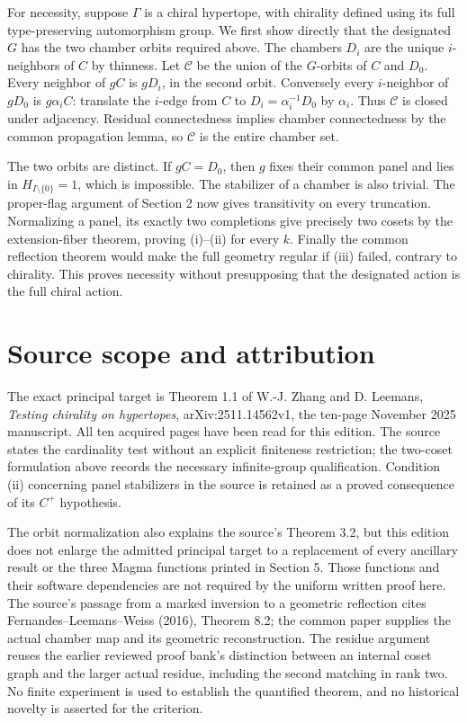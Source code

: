 For necessity, suppose $\Gamma$ is a chiral hypertope, with chirality defined using its full type-preserving automorphism group. We first show directly that the designated $G$ has the two chamber orbits required above. The chambers $D_i$ are the unique $i$-neighbors of $C$ by thinness. Let $\mathcal C$ be the union of the $G$-orbits of $C$ and $D_0$. Every neighbor of $gC$ is $gD_i$, in the second orbit. Conversely every $i$-neighbor of $gD_0$ is $g\alpha_i C$: translate the $i$-edge from $C$ to $D_i=\alpha_i^{-1}D_0$ by $\alpha_i$. Thus $\mathcal C$ is closed under adjacency. Residual connectedness implies chamber connectedness by the common propagation lemma, so $\mathcal C$ is the entire chamber set.

The two orbits are distinct. If $gC=D_0$, then $g$ fixes their common panel and lies in $H_{I\setminus\{0\}}=1$, which is impossible. The stabilizer of a chamber is also trivial. The proper-flag argument of Section 2 now gives transitivity on every truncation. Normalizing a panel, its exactly two completions give precisely two cosets by the extension-fiber theorem, proving (i)--(ii) for every $k$. Finally the common reflection theorem would make the full geometry regular if (iii) failed, contrary to chirality. This proves necessity without presupposing that the designated action is the full chiral action.

\section{Source scope and attribution}
The exact principal target is Theorem 1.1 of W.-J. Zhang and D. Leemans, \emph{Testing chirality on hypertopes}, arXiv:2511.14562v1, the ten-page November 2025 manuscript. All ten acquired pages have been read for this edition. The source states the cardinality test without an explicit finiteness restriction; the two-coset formulation above records the necessary infinite-group qualification. Condition (ii) concerning panel stabilizers in the source is retained as a proved consequence of its $C^+$ hypothesis.

The orbit normalization also explains the source's Theorem 3.2, but this edition does not enlarge the admitted principal target to a replacement of every ancillary result or the three Magma functions printed in Section 5. Those functions and their software dependencies are not required by the uniform written proof here. The source's passage from a marked inversion to a geometric reflection cites Fernandes--Leemans--Weiss (2016), Theorem 8.2; the common paper supplies the actual chamber map and its geometric reconstruction. The residue argument reuses the earlier reviewed proof bank's distinction between an internal coset graph and the larger actual residue, including the second matching in rank two. No finite experiment is used to establish the quantified theorem, and no historical novelty is asserted for the criterion.
